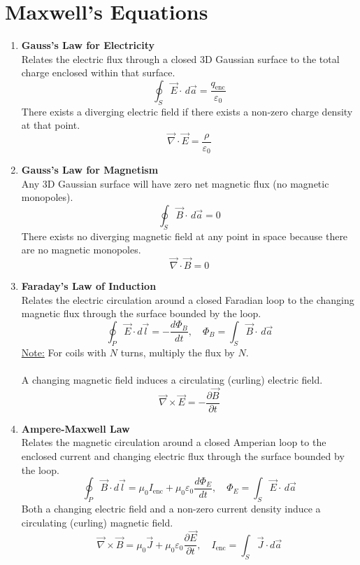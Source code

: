 \documentclass[12pt]{article}
\begin{document}
\section*{Maxwell's Equations}
\begin{enumerate}
    \item \textbf{Gauss's Law for Electricity}\\
    Relates the electric flux through a closed 3D Gaussian surface to the total charge enclosed within that surface.
    \[\oint_S \vec{E}\cdot\,d\vec{a}=\frac{q_{\text{enc}}}{\varepsilon_0}\]
     There exists a diverging electric field if there exists a non-zero charge density at that point.
    \[\vec{\nabla}\cdot\vec{E}=\frac{\rho}{\varepsilon_0}\]

    \item \textbf{Gauss's Law for Magnetism}\\
    Any 3D Gaussian surface will have zero net magnetic flux (no magnetic monopoles).
    \[\oint_S \vec{B}\cdot\,d\vec{a}=0\]
    There exists no diverging magnetic field at any point in space because there are no magnetic monopoles.
    \[\vec{\nabla}\cdot\vec{B}=0\]

    \item \textbf{Faraday's Law of Induction}\\
    Relates the electric circulation around a closed Faradian loop to the changing magnetic flux through the surface bounded by the loop.    
    \[\oint_P \vec{E}\cdot d\vec{l}=-\frac{d\Phi_B}{dt}, \quad \Phi_B = \int_S \vec{B}\cdot\,d\vec{a}\]
    \underline{Note:} For coils with $N$ turns, multiply the flux by $N$.\\\\
    A changing magnetic field induces a circulating (curling) electric field.
    \[\vec{\nabla}\times\vec{E}=-\frac{\partial \vec{B}}{\partial t}\]

    \item \textbf{Ampere-Maxwell Law}\\
    Relates the magnetic circulation around a closed Amperian loop to the enclosed current and changing electric flux through the surface bounded by the loop.
    \[\oint_P \vec{B}\cdot d\vec{l}= \mu_0I_{\text{enc}}+\mu_0\varepsilon_0 \frac{d\Phi_E}{dt},\quad \Phi_E=\int_S \vec{E}\cdot\,d\vec{a}\]
    Both a changing electric field and a non-zero current density induce a circulating (curling) magnetic field.
    \[\vec{\nabla}\times\vec{B}= \mu_0\vec{J}+\mu_0\varepsilon_0 \frac{\partial \vec{E}}{\partial t}, \quad I_{\text{enc}}=\int_S \vec{J}\cdot d\vec{a}\]
\end{enumerate}
\end{document}
